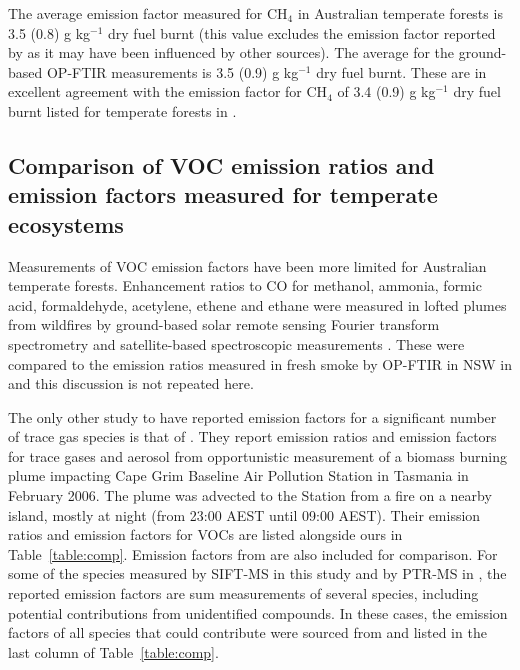 \documentclass[acp, manuscript]{copernicus}
\begin{document}
The average emission factor measured for CH$_4$ in Australian temperate forests is 3.5 (0.8) g kg$^{-1}$ dry fuel burnt (this value excludes the emission factor reported by \citet{Rea2016} as it may have been influenced by other sources). The average for the ground-based OP-FTIR measurements is 3.5 (0.9) g kg$^{-1}$ dry fuel burnt. These are in excellent agreement with the emission factor for CH$_4$  of 3.4 (0.9) g kg$^{-1}$ dry fuel burnt listed for temperate forests in  \citet[Table S4, February 2015 update]{Akagi2011}. 

\subsection{Comparison of VOC emission ratios and emission factors measured for temperate ecosystems}
Measurements of VOC emission factors have been more limited for Australian temperate forests. Enhancement ratios to CO for methanol, ammonia, formic acid, formaldehyde, acetylene, ethene and ethane were measured in lofted plumes from wildfires by ground-based solar remote sensing Fourier transform spectrometry \citep{Paton-Walsh2005, Paton-Walsh2008} and satellite-based spectroscopic measurements \citep{Young2011,Glatthor2013}. These were compared to the emission ratios measured in fresh smoke by OP-FTIR in NSW in \citet{Paton-Walsh2014} and this discussion is not repeated here. 

The only other study to have reported emission factors for a significant number of trace gas species is that of \citet{Lawson2015}. They report emission ratios and emission factors for trace gases and aerosol from opportunistic measurement of a biomass burning plume impacting Cape Grim Baseline Air Pollution Station in Tasmania in February 2006. The plume was advected to the Station from a fire on a nearby island, mostly at night (from 23:00 AEST until 09:00 AEST). Their emission ratios and emission factors for VOCs are listed alongside ours in Table~\ref{table:comp}. Emission factors from  \citet[Table S4, February 2015 update]{Akagi2011} are also included for comparison. For some of the species measured by SIFT-MS in this study and by PTR-MS in \citet{Lawson2015}, the reported emission factors are sum measurements of several species, including potential contributions from unidentified compounds. In these cases, the emission factors of all species that could contribute were sourced from \citet[Table S4, February 2015 update]{Akagi2011} and listed in the last column of Table~\ref{table:comp}. 
\end{document}
